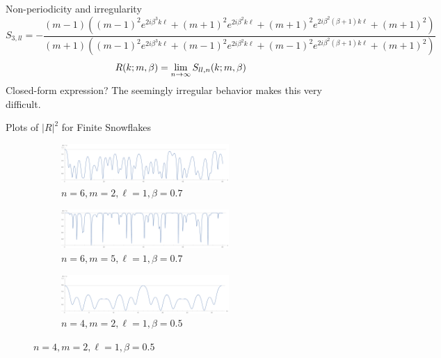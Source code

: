 \documentclass{beamer}
\newcommand{\abs}[1]{\left\lvert#1\right\rvert}
\begin{document}
  \begin{frame}{Non-periodicity and irregularity}{}
    {\footnotesize
    \begin{equation*}
      S_{3,ll} = -\frac{(m-1) \left((m-1)^2 e^{2 i \beta^3 k \ell}+(m+1)^2 e^{2 i \beta^2 k \ell}+(m+1)^2 e^{2 i \beta^2 (\beta+1) k
         \ell}+(m+1)^2\right)}{(m+1) \left((m-1)^2 e^{2 i \beta^3 k \ell}+(m-1)^2 e^{2 i \beta^2 k \ell}+(m-1)^2 e^{2 i \beta^2
         (\beta+1) k \ell}+(m+1)^2\right)}
    \end{equation*}}
    \vspace{1em}
    \pause
    \[
      R(k;m,\beta) = \lim_{n\to\infty} S_{ll,n}(k;m,\beta)
      \vspace{1em}
    \]
    Closed-form expression? The seemingly irregular behavior makes this very difficult.
  \end{frame}

  \begin{frame}{Plots of $\abs{R}^2$ for Finite Snowflakes}
    \begin{figure}
      \begin{subfigure}[t]{\textwidth}
        \centering
        \includegraphics[width=0.7\textwidth]{../latex/img/reflection_n=6_m=2_l=1_b=07_kmax=80}
        \caption{$n=6, m=2, \ell=1, \beta=0.7$}
      \end{subfigure}
      \begin{subfigure}[t]{\textwidth}
        \centering
        \includegraphics[width=0.7\textwidth]{../latex/img/reflection_n=6_m=5_l=1_b=07_kmax=80}
        \caption{$n=6, m=5, \ell=1, \beta=0.7$}
      \end{subfigure}
      \begin{subfigure}[t]{\textwidth}
        \centering
        \includegraphics[width=0.7\textwidth]{../latex/img/reflection_n=4_m=2_l=1_b=05_kmax=32pi}
        \caption{$n=4, m=2, \ell=1, \beta=0.5$}
      \end{subfigure}
    \end{figure}
  \end{frame}
\end{document}
